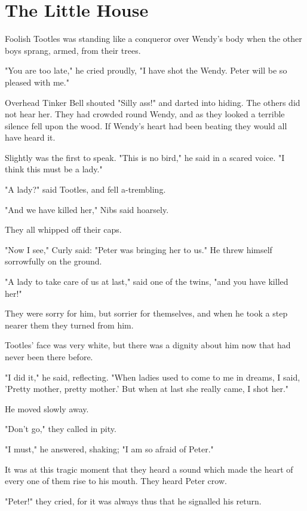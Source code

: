 
\chapter{The Little House}

Foolish Tootles was standing like a conqueror over Wendy's body
when the other boys sprang, armed, from their trees.

"You are too late," he cried proudly, "I have shot the Wendy.
Peter will be so pleased with me."

Overhead Tinker Bell shouted "Silly ass!\@" and darted into hiding.
The others did not hear her.
They had crowded round Wendy, and as they looked a terrible silence fell upon the wood.
If Wendy's heart had been beating they would all have heard it.

Slightly was the first to speak.
"This is no bird," he said in a scared voice.
"I think this must be a lady."

"A lady?\@" said Tootles, and fell a-trembling.

"And we have killed her," Nibs said hoarsely.

They all whipped off their caps.

"Now I see," Curly said:
"Peter was bringing her to us."
He threw himself sorrowfully on the ground.

"A lady to take care of us at last," said one of the twins,
"and you have killed her!"

They were sorry for him, but sorrier for themselves,
and when he took a step nearer them they turned from him.

Tootles' face was very white, but there was a dignity about him now that had never been there before.

"I did it," he said, reflecting.
"When ladies used to come to me in dreams,
I said, 'Pretty mother, pretty mother.'
But when at last she really came, I shot her."

He moved slowly away.

"Don't go," they called in pity.

"I must," he answered, shaking;
"I am so afraid of Peter."

It was at this tragic moment that they heard a sound which made the heart of every one of them rise to his mouth.
They heard Peter crow.

"Peter!\@" they cried, for it was always thus that he signalled his return.

